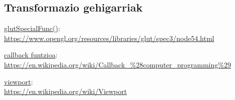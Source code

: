 \documentclass[12pt]{article}
\begin{document}
\subsection{Transformazio gehigarriak}

\pagebreak




\begin{thebibliography}{9}

\underline{glutSpecialFunc()}:\\
\url{https://www.opengl.org/resources/libraries/glut/spec3/node54.html}

\underline{callback funtzioa}:\\
\url{https://en.wikipedia.org/wiki/Callback_%28computer_programming%29}

\underline{viewport}:\\
\url{https://en.wikipedia.org/wiki/Viewport}

\end{thebibliography}
\end{document}
